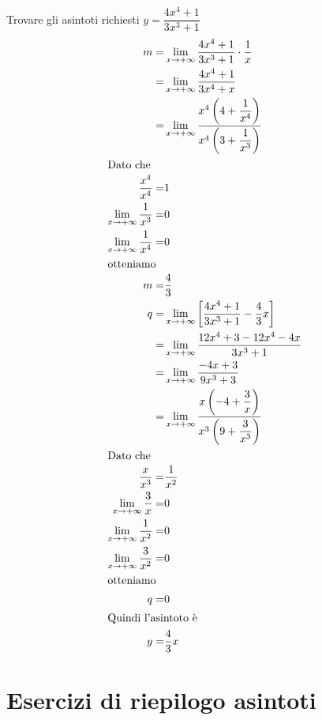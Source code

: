 \begin{exercise}
	Trovare gli asintoti richiesti
	$y=\dfrac{4x^4+1}{3x^3+1}$
	\tcblower
	\begin{align*}
	m=&\lim_{x\to +\infty}\dfrac{4x^4+1}{3x^3+1}\cdot\dfrac{1}{x}\\
	=&\lim_{x\to +\infty}\dfrac{4x^4+1}{3x^4+x}\\
	=&\lim_{x\to +\infty}\dfrac{x^4\left(4+\dfrac{1}{x^4}\right)}{x^4\left(3+\dfrac{1}{x^3}\right)}\\
	\intertext{Dato che}
	\dfrac{x^4}{x^4}=&1\\
	\lim_{x\to +\infty}\dfrac{1}{x^3}=&0\\
	\lim_{x\to +\infty}\dfrac{1}{x^4}=&0\\
	\intertext{otteniamo}
	m=&\dfrac{4}{3}\\
	q=&\lim_{x\to +\infty}\left[\dfrac{4x^4+1}{3x^3+1}-\dfrac{4}{3}x\right]\\
	=&\lim_{x\to +\infty}\dfrac{12x^4+3-12x^4-4x}{3x^3+1}\\
	=&\lim_{x\to +\infty}\dfrac{-4x+3}{9x^3+3}\\
	=&\lim_{x\to +\infty}\dfrac{x\left(-4+\dfrac{3}{x}\right)}{x^3\left(9+\dfrac{3}{x^3}\right)}\\
	\intertext{Dato che}
	\dfrac{x}{x^3}=&\dfrac{1}{x^2}\\
	\lim_{x\to +\infty}\dfrac{3}{x}=&0\\
	\lim_{x\to +\infty}\dfrac{1}{x^2}=&0\\
	\lim_{x\to +\infty}\dfrac{3}{x^2}=&0\\
	\intertext{otteniamo}
	q=&0\\
	\intertext{Quindi l'asintoto è}
	y=&\dfrac{4}{3}x
	\end{align*}
\end{exercise}
\section{Esercizi di riepilogo asintoti}
 
